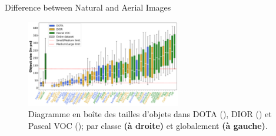 \begin{subsectionframemod}{Difference between Natural and Aerial Images}
    \begin{figure}
        \includegraphics[width=0.6\textwidth]{Figures/object_sizes.png}
        \caption{Diagramme en boîte des tailles d'objets dans DOTA (\cite{xia2018dota}), DIOR (\cite{li2020object}) et Pascal VOC (\cite{everingham2010pascal}); par classe \textbf{(à droite)} et globalement \textbf{(à gauche)}.}
    \end{figure}


\end{subsectionframemod}